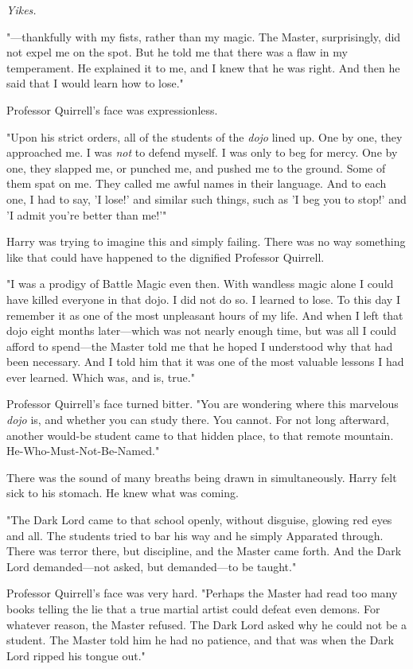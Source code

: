 \emph{Yikes.}

"---thankfully with my fists, rather than my magic. The Master, surprisingly, 
did not expel me on the spot. But he told me that there was a flaw in my 
temperament. He explained it to me, and I knew that he was right. And then he 
said that I would learn how to lose."

Professor Quirrell's face was expressionless.

"Upon his strict orders, all of the students of the \emph{dojo} lined up. One 
by one, they approached me. I was \emph{not} to defend myself. I was only to 
beg for mercy. One by one, they slapped me, or punched me, and pushed me to the 
ground. Some of them spat on me. They called me awful names in their language. 
And to each one, I had to say, 'I lose!' and similar such things, such as 'I 
beg you to stop!' and 'I admit you're better than me!'"

Harry was trying to imagine this and simply failing. There was no way something 
like that could have happened to the dignified Professor Quirrell.

"I was a prodigy of Battle Magic even then. With wandless magic alone I could 
have killed everyone in that dojo. I did not do so. I learned to lose. To this 
day I remember it as one of the most unpleasant hours of my life. And when I 
left that dojo eight months later---which was not nearly enough time, but was 
all I could afford to spend---the Master told me that he hoped I understood why 
that had been necessary. And I told him that it was one of the most valuable 
lessons I had ever learned. Which was, and is, true."

Professor Quirrell's face turned bitter. "You are wondering where this 
marvelous \emph{dojo} is, and whether you can study there. You cannot. For not 
long afterward, another would-be student came to that hidden place, to that 
remote mountain. He-Who-Must-Not-Be-Named."

There was the sound of many breaths being drawn in simultaneously. Harry felt 
sick to his stomach. He knew what was coming.

"The Dark Lord came to that school openly, without disguise, glowing red eyes 
and all. The students tried to bar his way and he simply Apparated through. 
There was terror there, but discipline, and the Master came forth. And the Dark 
Lord demanded---not asked, but demanded---to be taught."

Professor Quirrell's face was very hard. "Perhaps the Master had read too many 
books telling the lie that a true martial artist could defeat even demons. For 
whatever reason, the Master refused. The Dark Lord asked why he could not be a 
student. The Master told him he had no patience, and that was when the Dark 
Lord ripped his tongue out."

